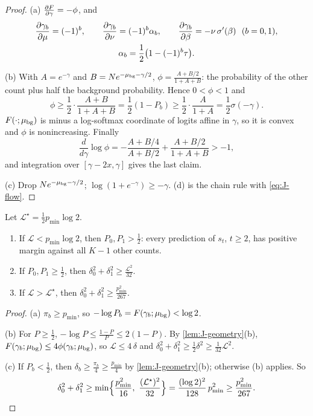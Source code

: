 \begin{proof}
(a) $\pd{F}{\gamma}=-\phi$, and
\begin{gather*}
 \pd{\gamma_b}{\cnt}=(-1)^b,\qquad \pd{\gamma_b}{\nu}=(-1)^b\alpha_b,\qquad \pd{\gamma_b}{\beta}=-\nu\,\sigma'(\beta)\ \ (b=0,1),\\
 \alpha_b=\tfrac{1}{2}\bigl(1-(-1)^b\tau\bigr).
\end{gather*}

(b) With $A=e^{-\gamma}$ and $B=Ne^{-\mu_{\mathrm{bg}}-\gamma/2}$, $\phi=\frac{A+B/2}{1+A+B}$: the probability of the other count plus half the background
probability. Hence $0<\phi<1$ and
\[
 \phi\ge\frac{1}{2}\cdot\frac{A+B}{1+A+B}=\frac{1}{2}(1-P_b)\ge\frac{1}{2}\cdot\frac{A}{1+A}=\frac{1}{2}\sigma(-\gamma).
\]
$F(\cdot;\mu_{\mathrm{bg}})$ is minus a log-softmax coordinate of logits affine in $\gamma$, so it is convex and $\phi$ is nonincreasing. Finally
\[
 \frac{d}{d\gamma}\log\phi=-\frac{A+B/4}{A+B/2}+\frac{A+B/2}{1+A+B}>-1,
\]
and integration over $[\gamma-2x,\gamma]$ gives the last claim.

(c) Drop $Ne^{-\mu_{\mathrm{bg}}-\gamma/2}$; $\log(1+e^{-\gamma})\ge-\gamma$. (d) is the chain rule with \cref{eq:J-flow}.
\end{proof}

\begin{lemma}
\label{lem:J-levels}
Let $\mathcal L^\star=\frac{1}{2}p_{\min}\log2$.
\begin{enumerate}[label=(\alph*),leftmargin=*,itemsep=2pt,topsep=3pt]
\item If $\mathcal L<p_{\min}\log2$, then $P_0,P_1>\frac{1}{2}$: every prediction of $s_t$, $t\ge2$, has positive margin against all $K-1$ other counts.
\item If $P_0,P_1\ge\frac{1}{2}$, then $\delta_0^2+\delta_1^2\ge \frac{\mathcal L^2}{32}$.
\item If $\mathcal L>\mathcal L^\star$, then $\delta_0^2+\delta_1^2\ge \frac{p_{\min}^2}{267}$.
\end{enumerate}
\end{lemma}

\begin{proof}
(a) $\pi_b\ge p_{\min}$, so $-\log P_b=F(\gamma_b;\mu_{\mathrm{bg}})<\log2$.

(b) For $P\ge\frac{1}{2}$, $-\log P\le\frac{1-P}{P}\le2(1-P)$. By \cref{lem:J-geometry}(b), $F(\gamma_b;\mu_{\mathrm{bg}})\le4\phi(\gamma_b;\mu_{\mathrm{bg}})$, so $\mathcal L\le4\,\delta$ and
$\delta_0^2+\delta_1^2\ge\frac{1}{2}\delta^2\ge\frac{1}{32}\mathcal L^2$.

(c) If $P_b<\frac{1}{2}$, then $\delta_b\ge\frac{\pi_b}{4}\ge\frac{p_{\min}}{4}$ by \cref{lem:J-geometry}(b); otherwise (b) applies. So
\[
 \delta_0^2+\delta_1^2\ge\min\Bigl\{\frac{p_{\min}^2}{16},\ \frac{(\mathcal L^\star)^2}{32}\Bigr\}=\frac{(\log2)^2}{128}\,p_{\min}^2\ge\frac{p_{\min}^2}{267}.
\qedhere
\]
\end{proof}

